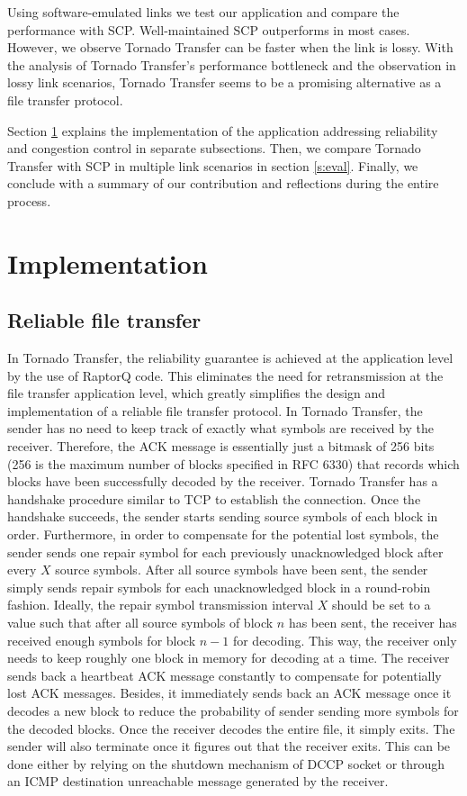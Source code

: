 \documentclass{sig-alternate-10pt}
\begin{document}
Using software-emulated links we test our application and compare the
performance with SCP. Well-maintained SCP outperforms in most cases. However, we
observe Tornado Transfer can be faster when the link is lossy. With the analysis of
Tornado Transfer's performance bottleneck and the observation in lossy link scenarios,
Tornado Transfer seems to be a promising alternative as a file transfer protocol.

Section \ref{s:impl} explains the implementation of the application addressing
reliability and congestion control in separate subsections. Then, we compare
Tornado Transfer with SCP in multiple link scenarios in section \ref{s:eval}. Finally,
we conclude with a summary of our contribution and reflections during the entire
process.

\section{Implementation}\label{s:impl}

\subsection{Reliable file transfer}

In Tornado Transfer, the reliability guarantee is achieved at the application level by the use of RaptorQ code. This eliminates the need for retransmission at the file transfer application level, which greatly simplifies the design and implementation of a reliable file transfer protocol. In Tornado Transfer, the sender has no need to keep track of exactly what symbols are received by the receiver. Therefore, the ACK message is essentially just a bitmask of 256 bits (256 is the maximum number of blocks specified in RFC 6330) that records which blocks have been successfully decoded by the receiver. Tornado Transfer has a handshake procedure similar to TCP to establish the connection. Once the handshake succeeds, the sender starts sending source symbols of each block in order. Furthermore, in order to compensate for the potential lost symbols, the sender sends one repair symbol for each previously unacknowledged block after every $X$ source symbols. After all source symbols have been sent, the sender simply sends repair symbols for each unacknowledged block in a round-robin fashion. Ideally, the repair symbol transmission interval $X$ should be set to a value such that after all source symbols of block $n$ has been sent, the receiver has received enough symbols for block $n-1$ for decoding. This way, the receiver only needs to keep roughly one block in memory for decoding at a time. The receiver sends back a heartbeat ACK message constantly to compensate for potentially lost ACK messages. Besides, it immediately sends back an ACK message once it decodes a new block to reduce the probability of sender sending more symbols for the decoded blocks. Once the receiver decodes the entire file, it simply exits. The sender will also terminate once it figures out that the receiver exits. This can be done either by relying on the shutdown mechanism of DCCP socket or through an ICMP destination unreachable message generated by the receiver.
\end{document}

